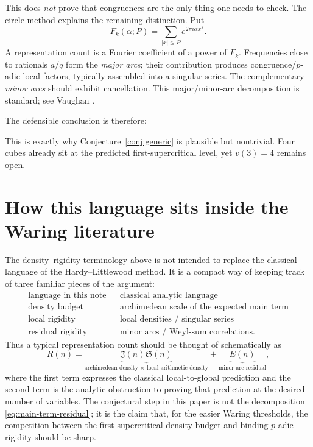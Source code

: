 \documentclass[../Axiomathic.tex]{subfiles}
\begin{document}
This does \emph{not} prove that congruences are the only thing one needs to check.  The circle method explains the remaining distinction.  Put
\[
  F_k(\alpha;P)=\sum_{|x|\le P}e^{2\pi i\alpha x^k}.
\]
A representation count is a Fourier coefficient of a power of $F_k$.  Frequencies close to rationals $a/q$ form the \emph{major arcs}; their contribution produces congruence/$p$-adic local factors, typically assembled into a singular series.  The complementary \emph{minor arcs} should exhibit cancellation.  This major/minor-arc decomposition is standard; see Vaughan \cite{Vaughan1997}.

The defensible conclusion is therefore:
\begin{center}
\end{center}
This is exactly why Conjecture~\ref{conj:generic} is plausible but nontrivial.  Four cubes already sit at the predicted first-supercritical level, yet $v(3)=4$ remains open.


\section{How this language sits inside the Waring literature}\label{sec:literature-translation}

The density--rigidity terminology above is not intended to replace the classical language of the Hardy--Littlewood method.  It is a compact way of keeping track of three familiar pieces of the argument:
\[
\begin{array}{ccl}
\text{language in this note} && \text{classical analytic language}\\
\hline
\text{density budget} && \text{archimedean scale of the expected main term}\\
\text{local rigidity} && \text{local densities / singular series}\\
\text{residual rigidity} && \text{minor arcs / Weyl-sum correlations}.
\end{array}
\]
Thus a typical representation count should be thought of schematically as
\begin{equation}\label{eq:main-term-residual}
  R(n)=\underbrace{\mathfrak J(n)\mathfrak S(n)}_{\text{archimedean density }\times\text{ local arithmetic density}}
  +\underbrace{E(n)}_{\text{minor-arc residual}},
\end{equation}
where the first term expresses the classical local-to-global prediction and the second term is the analytic obstruction to proving that prediction at the desired number of variables.  The conjectural step in this paper is not the decomposition \eqref{eq:main-term-residual}; it is the claim that, for the easier Waring thresholds, the competition between the first-supercritical density budget and binding $p$-adic rigidity should be sharp.
\end{document}
